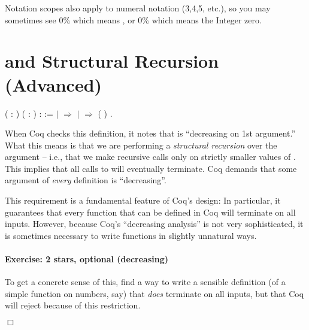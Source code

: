 \documentclass[12pt]{report}
\begin{document}
    Notation scopes also apply to numeral notation (3,4,5, etc.), so you
    may sometimes see 0\% which means , or 0\% which means the
    Integer zero.


\section{\texorpdfstring{\protect{}}{Fixpoint} and Structural Recursion (Advanced)}

\begin{coqdoccode}
\coqdocemptyline
\coqdocnoindent
{}  ( : ) ( : ) :  :=\coqdoceol
\coqdocindent{1.00em}
  \coqdoceol
\coqdocindent{2.00em}
\ensuremath{|}  \ensuremath{\Rightarrow} \coqdoceol
\coqdocindent{2.00em}
\ensuremath{|}   \ensuremath{\Rightarrow}  (  )\coqdoceol
\coqdocindent{1.00em}
.\coqdoceol
\coqdocemptyline
\end{coqdoccode}
When Coq checks this definition, it notes that  is
    ``decreasing on 1st argument.''  What this means is that we are
    performing a \textit{structural recursion} over the argument  -- i.e.,
    that we make recursive calls only on strictly smaller values of
    .  This implies that all calls to  will eventually
    terminate.  Coq demands that some argument of \textit{every} 
    definition is ``decreasing''.


    This requirement is a fundamental feature of Coq's design: In
    particular, it guarantees that every function that can be defined
    in Coq will terminate on all inputs.  However, because Coq's
    ``decreasing analysis'' is not very sophisticated, it is sometimes
    necessary to write functions in slightly unnatural ways. 

\paragraph{Exercise: 2 stars, optional (decreasing)}

 To get a concrete sense of this, find a way to write a sensible
     definition (of a simple function on numbers, say) that
    \textit{does} terminate on all inputs, but that Coq will reject because
    of this restriction. \begin{coqdoccode}
\coqdocemptyline
\end{coqdoccode}
\ensuremath{\Box} 
\end{document}
